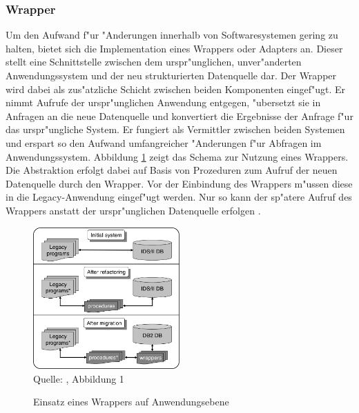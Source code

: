 \subsubsection{Wrapper}

Um den Aufwand f"ur "Anderungen innerhalb von Softwaresystemen gering zu halten, bietet sich die Implementation eines Wrappers oder Adapters an. Dieser stellt eine Schnittstelle zwischen dem urspr"unglichen, unver"anderten Anwendungssystem und der neu strukturierten Datenquelle dar. Der Wrapper wird dabei als zus"atzliche Schicht zwischen beiden Komponenten eingef"ugt. Er nimmt Aufrufe der urspr"unglichen Anwendung entgegen, "ubersetzt sie in Anfragen an die neue Datenquelle und konvertiert die Ergebnisse der Anfrage f"ur das urspr"ungliche System. Er fungiert als Vermittler zwischen beiden Systemen und erspart so den Aufwand umfangreicher "Anderungen f"ur Abfragen im Anwendungssystem.
\lb
Abbildung \ref{pic:application_wrapper} zeigt das Schema zur Nutzung eines Wrappers. Die Abstraktion erfolgt dabei auf Basis von Prozeduren zum Aufruf der neuen Datenquelle durch den Wrapper. Vor der Einbindung des Wrappers m"ussen diese in die Legacy-Anwendung eingef"ugt werden. Nur so kann der sp"atere Aufruf des Wrappers anstatt der urspr"unglichen Datenquelle erfolgen \cite{henrard-2008}. 

\begin{figure}[h!]
	\centering
	\caption{Einsatz eines Wrappers auf Anwendungsebene}
	\label{pic:application_wrapper}
	\includegraphics[width=0.5\textwidth]{../images/large_scale_fig_01.png} \\
	\tiny Quelle: \citep{henrard-2008}, Abbildung 1
\end{figure}


